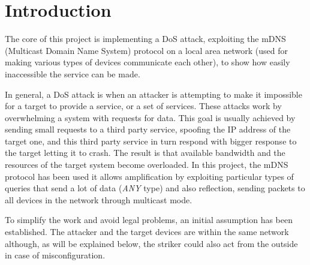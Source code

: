 \documentclass[fleqn, 11pt]{SelfArx} %
\affiliation{\textit{Department of Computer Engineering, University of Pavia, Pavia, Italy}} %
\affiliation{\textit{Enterprise Digital Infrastructure}} %
\begin{document}
\maketitle %

\tableofcontents %
\vfill\null

\thispagestyle{empty} %



\section{Introduction} %
The core of this project is implementing a DoS attack, exploiting the mDNS (Multicast Domain Name System) protocol \cite{rfc6762} on a local area network (used for making various types of devices communicate each other), to show how easily inaccessible the service can be made. \newline

In general, a DoS attack is when an attacker is attempting to make it impossible for a target to provide a service, or a set of services. These attacks work by overwhelming a system with requests for data. \newline
This goal is usually achieved by sending small requests to a third party service, spoofing the IP address of the target one, and this third party service in turn respond with bigger response to the target letting it to crash. \newline The result is that available bandwidth and the resources of the target system become overloaded.\newline
In this project, the mDNS protocol has been used it allows amplification by exploiting particular types of queries that send a lot of data ({\it{ANY}} type) and also reflection, sending packets to all devices in the network through multicast mode. \newline

To simplify the work and avoid legal problems, an initial assumption has been established. The attacker and the target devices are within the same network although, as will be explained below, the striker could also act from the outside in case of misconfiguration.
\end{document}
